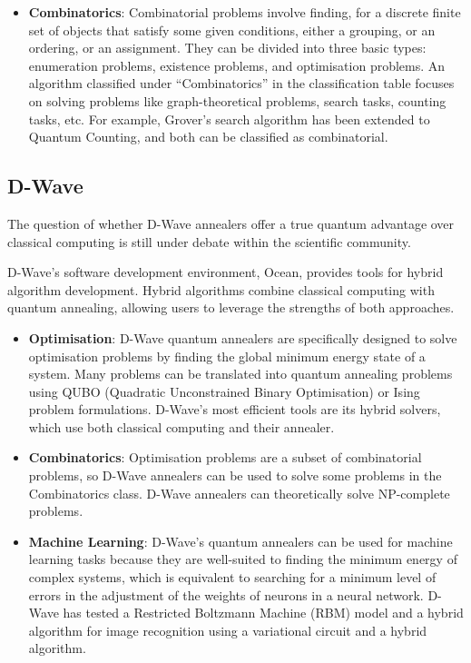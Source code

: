 \begin{itemize}
\item \textbf{Combinatorics}: Combinatorial problems involve finding, for a discrete finite set of objects that
  satisfy some given conditions, either a grouping, or an ordering, or an assignment. They can be divided into
  three basic types: enumeration problems, existence problems, and optimisation problems.
  An algorithm classified under “Combinatorics” in the classification table focuses on solving problems like
  graph-theoretical problems, search tasks, counting tasks, etc. For example, Grover’s search algorithm has been
  extended to Quantum Counting, and both can be classified as combinatorial.
\end{itemize}

\subsection{D-Wave}

The question of whether D-Wave annealers offer a true quantum advantage over classical computing is still under
debate within the scientific community.

D-Wave's software development environment, Ocean, provides tools for hybrid algorithm development. Hybrid algorithms
combine classical computing with quantum annealing, allowing users to leverage the strengths of both approaches.

\begin{itemize}
\item \textbf{Optimisation}: D-Wave quantum annealers are specifically designed to solve optimisation problems by
  finding the global minimum energy state of a system. Many problems can be translated into quantum annealing problems
  using QUBO (Quadratic Unconstrained Binary Optimisation) or Ising problem formulations. D-Wave's most efficient tools
  are its hybrid solvers, which use both classical computing and their annealer.
  
\item \textbf{Combinatorics}: Optimisation problems are a subset of combinatorial problems, so D-Wave annealers can be
  used to solve some problems in the Combinatorics class.
  D-Wave annealers can theoretically solve NP-complete problems.

\item \textbf{Machine Learning}: D-Wave's quantum annealers can be used for machine learning tasks because they are
  well-suited to finding the minimum energy of complex systems, which is equivalent to searching for a minimum level
  of errors in the adjustment of the weights of neurons in a neural network.
  D-Wave has tested a Restricted Boltzmann Machine (RBM) model and a hybrid algorithm for image recognition using a
  variational circuit and a hybrid algorithm.
\end{itemize}
